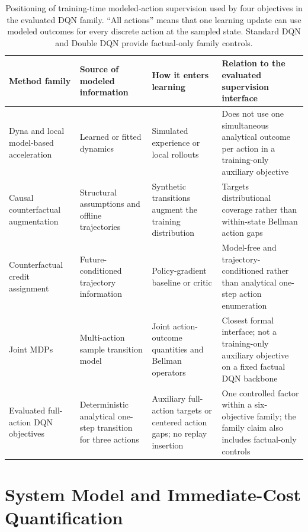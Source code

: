 \documentclass[11pt]{article}
\begin{document}
\begin{table}[H]
\centering
\caption{Positioning of training-time modeled-action supervision used by four objectives in the evaluated DQN family. ``All actions'' means that one learning update can use modeled outcomes for every discrete action at the sampled state. Standard DQN and Double DQN provide factual-only family controls.}
\label{tab:closest_methods}
\small
\setlength{\tabcolsep}{4pt}
\begin{tabularx}{\textwidth}{>{\raggedright\arraybackslash}p{}>{\raggedright\arraybackslash}p{}>{\raggedright\arraybackslash}p{}>{\raggedright\arraybackslash}X}
\toprule
Method family & Source of modeled information & How it enters learning & Relation to the evaluated supervision interface \\
\midrule
Dyna and local model-based acceleration~\cite{sutton1991dyna,gu2016continuous} & Learned or fitted dynamics & Simulated experience or local rollouts & Does not use one simultaneous analytical outcome per action in a training-only auxiliary objective \\
Causal counterfactual augmentation~\cite{armengol2024caiac} & Structural assumptions and offline trajectories & Synthetic transitions augment the training distribution & Targets distributional coverage rather than within-state Bellman action gaps \\
Counterfactual credit assignment~\cite{mesnard2021counterfactual} & Future-conditioned trajectory information & Policy-gradient baseline or critic & Model-free and trajectory-conditioned rather than analytical one-step action enumeration \\
Joint MDPs~\cite{kaya2026joint} & Multi-action sample transition model & Joint action-outcome quantities and Bellman operators & Closest formal interface; not a training-only auxiliary objective on a fixed factual DQN backbone \\
Evaluated full-action DQN objectives & Deterministic analytical one-step transition for three actions & Auxiliary full-action targets or centered action gaps; no replay insertion & One controlled factor within a six-objective family; the family claim also includes factual-only controls \\
\bottomrule
\end{tabularx}
\end{table}

\section{System Model and Immediate-Cost Quantification}
\label{sec:system}
\end{document}
